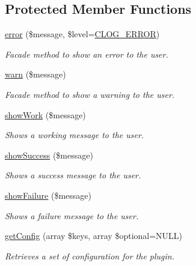 \subsection*{Protected Member Functions}
\begin{DoxyCompactItemize}
\item 
\hyperlink{classGenericPlugin_adb26ae57ef8765d8bb18f26216c5c2d6}{error} (\$message, \$level=\hyperlink{group__log__levels_gacd8b449d24550e76fa0b9682e816da94}{C\-L\-O\-G\-\_\-\-E\-R\-R\-O\-R})
\begin{DoxyCompactList}\small\item\em Facade method to show an error to the user. \end{DoxyCompactList}\item 
\hyperlink{classGenericPlugin_adc5289a073a5cae7197286792c7eb5e9}{warn} (\$message)
\begin{DoxyCompactList}\small\item\em Facade method to show a warning to the user. \end{DoxyCompactList}\item 
\hyperlink{classGenericPlugin_a6aaf2e225dcab0c5d759373d0ede60ce}{show\-Work} (\$message)
\begin{DoxyCompactList}\small\item\em Shows a working message to the user. \end{DoxyCompactList}\item 
\hyperlink{classGenericPlugin_aa6fa4fa1e988c64b045fe552c0905fbb}{show\-Success} (\$message)
\begin{DoxyCompactList}\small\item\em Shows a success message to the user. \end{DoxyCompactList}\item 
\hyperlink{classGenericPlugin_af2e0d786211846ea2b67841adb506c5d}{show\-Failure} (\$message)
\begin{DoxyCompactList}\small\item\em Shows a failure message to the user. \end{DoxyCompactList}\item 
\hyperlink{classGenericPlugin_a1c51ad511694c82131181d5f4c77d34c}{get\-Config} (array \$keys, array \$optional=N\-U\-L\-L)
\begin{DoxyCompactList}\small\item\em Retrieves a set of configuration for the plugin. \end{DoxyCompactList}\end{DoxyCompactItemize}
